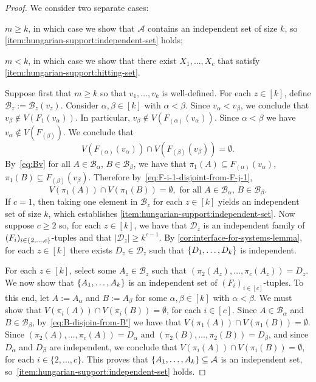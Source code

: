 \documentclass{patmorin}
\DeclarePairedDelimiter\set{\{}{\}}
\begin{document}
\begin{proof}
  We consider two separate cases:
  \begin{enumerate*}[label=(\arabic*)]
    \item $m\geq k$, in which case we show that $\mathcal{A}$ contains an independent set of size $k$, so \eqref{item:hungarian-support:independent-set} holds;
    \item $m<k$, in which case we show that there exist $X_1,\ldots,X_c$ that satisfy \eqref{item:hungarian-support:hitting-set}.
  \end{enumerate*}

  Suppose first that $m\geq k$ so that $v_1,\ldots,v_k$ is well-defined.  For each $z\in[k]$, define $\mathcal{B}_{z}:=\mathcal{B}_{z}(v_z)$. Consider $\alpha,\beta\in[k]$ with $\alpha<\beta$. Since $v_{\alpha} < v_{\beta}$, we conclude that $v_{\beta} \not\in V(F_1(v_{\alpha}))$. In particular, $v_{\beta} \not\in V(F_{(\alpha)}(v_{\alpha}))$. Since $\alpha<\beta$ we have $v_{\alpha}\not\in V(F_{(\beta)})$. We conclude that
  \begin{equation}
    V(F_{(\alpha)}(v_{\alpha})) \cap V(F_{(\beta)}(v_{\beta})) = \emptyset.
    \label{eq:F-i-1-disjoint-from-F-j-1}
  \end{equation}
  By~\eqref{eq:Bv} for all $A\in \mathcal{B}_{\alpha}$, $B\in\mathcal{B}_{\beta}$, we have that $\pi_1(A)\subseteq F_{(\alpha)}(v_{\alpha})$,  $\pi_1(B)\subseteq F_{(\beta)}(v_{\beta})$. Therefore by~\eqref{eq:F-i-1-disjoint-from-F-j-1},
  \begin{equation}
    V(\pi_1(A)) \cap V(\pi_1(B))=\emptyset, \textrm{ for all $A\in\mathcal{B}_\alpha$, $B\in\mathcal{B}_\beta$.}
    \label{eq:B-disjoin-from-B'}
  \end{equation}
  If $c=1$, then taking one element in $\mathcal{B}_z$ for each $z\in[k]$ yields an independent set of size $k$, which establishes \cref{item:hungarian-support:independent-set}.  Now suppose $c\ge 2$ so, for each $z\in[k]$, we have that $\mathcal{D}_z$ is an independent family of $(F_i)_{i\in\set{2,\ldots,c}}$-tuples and that $|\mathcal{D}_{z}|\geq k^{c-1}$. By \cref{cor:interface-for-systems-lemma}, for each $z\in[k]$ there exists $D_z\in\mathcal{D}_z$ such that $\set{D_1,\ldots,D_k}$ is independent.

  For each $z\in[k]$, select some $A_z\in\mathcal{B}_z$ such that $(\pi_2(A_z),\ldots,\pi_c(A_z))=D_z$.   We now show that $\set{A_1,\ldots,A_k}$ is an independent set of $(F_i)_{i\in[c]}$-tuples. To this end, let $A:=A_\alpha$ and $B:=A_\beta$ for some $\alpha,\beta\in[k]$ with $\alpha < \beta$.  We must show that $V(\pi_i(A))\cap V(\pi_i(B))=\emptyset$, for each $i\in[c]$. Since $A\in\mathcal{B}_{\alpha}$ and $B\in\mathcal{B}_{\beta}$, by~\eqref{eq:B-disjoin-from-B'} we have that $V(\pi_1(A))\cap V(\pi_1(B))=\emptyset$. Since $(\pi_2(A),\ldots,\pi_c(A))=D_{\alpha}$ and $(\pi_2(B),\ldots,\pi_2(B))=D_{\beta}$, and since $D_\alpha$ and $D_\beta$ are independent, we conclude that $V(\pi_i(A)) \cap V(\pi_i(B))=\emptyset$, for each $i\in\{2,\ldots,c\}$. This proves that $\set{A_1,\ldots,A_k}\subseteq\mathcal{A}$ is an independent set, so~\eqref{item:hungarian-support:independent-set} holds.


\end{proof}
\end{document}
